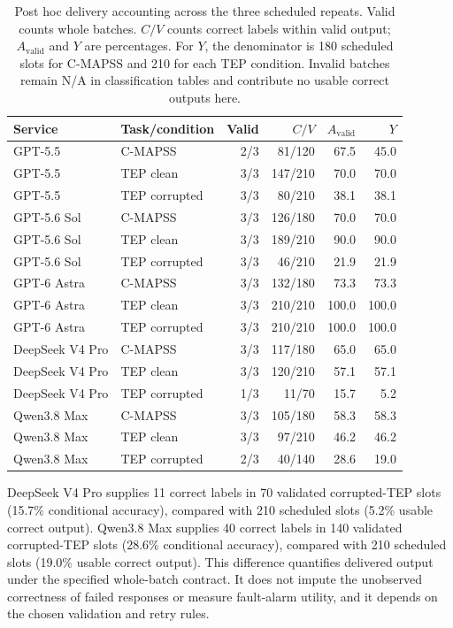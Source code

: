 \documentclass[11pt,a4paper]{article}
\begin{document}
\begin{table}[htbp]
\centering\small
\caption{Post hoc delivery accounting across the three scheduled repeats. Valid counts whole batches. $C/V$ counts correct labels within valid output; $A_{\mathrm{valid}}$ and $Y$ are percentages. For $Y$, the denominator is 180 scheduled slots for C-MAPSS and 210 for each TEP condition. Invalid batches remain N/A in classification tables and contribute no usable correct outputs here.}
\label{tab:usable}
\begin{tabular}{@{}llrrrr@{}}
\toprule
Service & Task/condition & Valid & $C/V$ & $A_{\mathrm{valid}}$ & $Y$ \\
\midrule
GPT-5.5 & C-MAPSS & 2/3 & 81/120 & 67.5 & 45.0 \\
GPT-5.5 & TEP clean & 3/3 & 147/210 & 70.0 & 70.0 \\
GPT-5.5 & TEP corrupted & 3/3 & 80/210 & 38.1 & 38.1 \\
GPT-5.6 Sol & C-MAPSS & 3/3 & 126/180 & 70.0 & 70.0 \\
GPT-5.6 Sol & TEP clean & 3/3 & 189/210 & 90.0 & 90.0 \\
GPT-5.6 Sol & TEP corrupted & 3/3 & 46/210 & 21.9 & 21.9 \\
GPT-6 Astra & C-MAPSS & 3/3 & 132/180 & 73.3 & 73.3 \\
GPT-6 Astra & TEP clean & 3/3 & 210/210 & 100.0 & 100.0 \\
GPT-6 Astra & TEP corrupted & 3/3 & 210/210 & 100.0 & 100.0 \\
DeepSeek V4 Pro & C-MAPSS & 3/3 & 117/180 & 65.0 & 65.0 \\
DeepSeek V4 Pro & TEP clean & 3/3 & 120/210 & 57.1 & 57.1 \\
DeepSeek V4 Pro & TEP corrupted & 1/3 & 11/70 & 15.7 & 5.2 \\
Qwen3.8 Max & C-MAPSS & 3/3 & 105/180 & 58.3 & 58.3 \\
Qwen3.8 Max & TEP clean & 3/3 & 97/210 & 46.2 & 46.2 \\
Qwen3.8 Max & TEP corrupted & 2/3 & 40/140 & 28.6 & 19.0 \\
\bottomrule
\end{tabular}
\end{table}

DeepSeek V4 Pro supplies 11 correct labels in 70 validated corrupted-TEP slots (15.7\% conditional accuracy), compared with 210 scheduled slots (5.2\% usable correct output). 
Qwen3.8 Max supplies 40 correct labels in 140 validated corrupted-TEP slots (28.6\% conditional accuracy), compared with 210 scheduled slots (19.0\% usable correct output). 
This difference quantifies delivered output under the specified whole-batch contract. It does not impute the unobserved correctness of failed responses or measure fault-alarm utility, and it depends on the chosen validation and retry rules.
\end{document}
